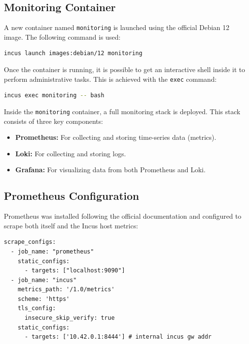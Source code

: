 \subsection*{Monitoring Container}

A new container named \texttt{monitoring} is launched using the official Debian 12 image. The following command is used:

\begin{lstlisting}[language=bash,caption={Command to create the monitoring container from a Debian 12 image}]
incus launch images:debian/12 monitoring
\end{lstlisting}

Once the container is running, it is possible to get an interactive shell inside it to perform administrative tasks. This is achieved with the \texttt{exec} command:

\begin{lstlisting}[language=bash,caption={Command used to obtain a shell inside the monitoring container}]
incus exec monitoring -- bash
\end{lstlisting}

Inside the \texttt{monitoring} container, a full monitoring stack is deployed. This stack consists of three key components:

\begin{itemize}
    \item \textbf{Prometheus:} For collecting and storing time-series data (metrics).
    \item \textbf{Loki:} For collecting and storing logs.
    \item \textbf{Grafana:} For visualizing data from both Prometheus and Loki.
\end{itemize}

\subsection*{Prometheus Configuration}

Prometheus was installed following the official documentation\cite{prometheus-getting-started} and configured to scrape both itself and the Incus host metrics:

\begin{lstlisting}[caption={Prometheus configuration scraping metrics from itself and the Incus host}]
scrape_configs:
  - job_name: "prometheus"
    static_configs:
      - targets: ["localhost:9090"]
  - job_name: "incus"
    metrics_path: '/1.0/metrics'
    scheme: 'https'
    tls_config:
      insecure_skip_verify: true
    static_configs:
      - targets: ['10.42.0.1:8444'] # internal incus gw addr
\end{lstlisting}


